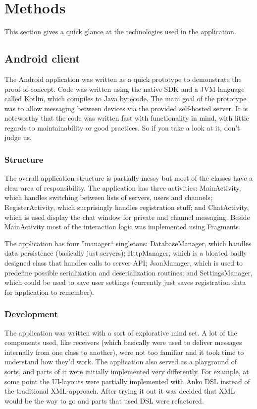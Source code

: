 \section{Methods}
This section gives a quick glance at the technologies used in the application.

\subsection{Android client}
The Android application was written as a quick prototype to demonstrate the proof-of-concept. Code was written using the native SDK and a JVM-language called Kotlin, which compiles to Java bytecode. The main goal of the prototype was to allow messaging between devices via the provided self-hosted server. It is noteworthy that the code was written fast with functionality in mind, with little regards to maintainability or good practices. So if you take a look at it, don't judge us.

\subsubsection{Structure}

The overall application structure is partially messy but most of the classes have a clear area of responsibility. The application has three activities: MainActivity, which handles switching between lists of servers, users and channels; RegisterActivity, which surprisingly handles registration stuff; and ChatActivity, which is used display the chat window for private and channel messaging. Beside MainActivity most of the interaction logic was implemented using Fragments.

The application has four ''manager`` singletons: DatabaseManager, which handles data persistence (basically just servers); HttpManager, which is a bloated badly designed class that handles calls to server API; JsonManager, which is used to predefine possible serialization and deserialization routines; and SettingsManager, which could be used to save user settings (currently just saves registration data for application to remember). 


\subsubsection{Development}

The application was written with a sort of explorative mind set. A lot of the components used, like receivers (which basically were used to deliver messages internally from one class to another), were not too familiar and it took time to understand how they'd work. The application also served as a playground of sorts, and parts of it were initially implemented very differently. For example, at some point the UI-layouts were partially implemented with Anko DSL instead of the traditional XML-approach. After trying it out it was decided that XML would be the way to go and parts that used DSL were refactored.


